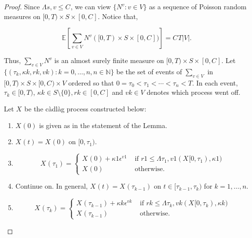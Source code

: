 \documentclass[12pt]{article}
\newcommand{\mb}{\mathbb}
\newcommand{\te}{\text}
\newcommand{\ep}{\epsilon}
\newcommand{\ind}{\hspace{24pt}}
\newcommand{\ex}[1]{\mb{E}\left[#1\right]}			%
\renewcommand{\v}{v}							%
\renewcommand{\S}{S}							%
\newcommand{\ev}{\ep}							%
\newcommand{\T}{T}								%
\renewcommand{\t}{t}							%
\renewcommand{\tt}{s}							%
\newcommand{\X}{X}								%
\newcommand{\vind}[1]{^{#1}}					%
\newcommand{\cind}[1]{_{#1}}					%
\newcommand{\tp}[1]{(#1)}						%
\newcommand{\tip}[1]{#1}						%
\newcommand{\const}{C}							%
\newcommand{\poiss}{N}							%
\renewcommand{\r}{r}							%
\newcommand{\indx}[1]{_{#1}}					%
\newcommand{\rt}{\tau}							%
\renewcommand{\it}{k}							%
\renewcommand{\mark}{\kappa}					%
\newcommand{\ratee}{\Lambda}					%
\begin{document}
\begin{proof}
Since \(\ratee{\tt,\v} \leq \const\indx{}\), we can view \(\{\poiss\vind{\v}:\v\in V\}\) as a sequence of Poisson random measures on \([0,\T)\times \S\times [0,\const\indx{}]\). Notice that,

\[\ex{\sum_{\v\in V}\poiss\vind{\v}([0,\T)\times\S\times[0,\const\indx{}])} = \const\indx{}\T|V|.\]

Thus, \(\sum_{\v\in V}\poiss\vind{\v}\) is an almost surely finite measure on \([0,\T)\times \S\times [0,\const\indx{}]\). Let \(\{(\rt\indx{\it},\mark{\it},\r{\it},\v{\it}):\it = 0,\dots,n, n\in \mb{N}\}\) be the set of events of \(\sum_{\v\in V}\) in \([0,\T)\times\S\times [0,\const\indx{})\times V\) ordered so that \(0=\rt\indx{0} < \rt\indx{1} < \cdots < \rt\indx{n} < \T\). In each event, \(\rt\indx{\it} \in [0,\T)\), \(\mark{\it}\in \S\setminus\{0\}, \r{\it} \in [0,\const\indx{}]\) and \(\v{\it} \in V\) denotes which process went off.

\ind Let \(\X\cind{}\tip{}\) be the c\`adl\`ag process constructed below:

\begin{enumerate}
\item \(\X\cind{}\tp{0}\) is given as in the statement of the Lemma.

\item \(\X\cind{}\tp{\t} = \X\cind{}\tp{0}\) on \([0,\rt\indx{1})\).

\item 

\[\X\cind{}\tp{\rt\indx{1}} = \begin{cases}
\X\cind{}\tp{0} + \mark{1}\ev\vind{\v{1}} &\te{ if } \r{1} \leq \ratee{\rt\indx{1},\v{1}}(\X\cind{}\tip{[0,\rt\indx{1})},\mark{1})\\
\X\cind{}\tp{0} &\te{ otherwise.}
\end{cases}
\] 

\item Continue on. In general, \(\X\cind{}\tp{\t} = \X\cind{}\tp{\rt\indx{\it-1}}\) on \(\t \in [\rt\indx{\it-1},\rt\indx{\it})\) for \(\it= 1,\dots,n\).

\item 

\[\X\cind{}\tp{\rt\indx{\it}} = \begin{cases}
\X\cind{}\tp{\rt\indx{\it-1}} + \mark{\it}\ev\vind{\v{\it}} &\te{ if } \r{\it} \leq \ratee{\rt\indx{\it},\v{\it}}(\X\cind{}\tip{[0,\rt\indx{\it})},\mark{\it})\\
\X\cind{}\tp{\rt\indx{\it-1}} &\te{ otherwise.}
\end{cases}\]


\end{enumerate}
\end{proof}
\end{document}
